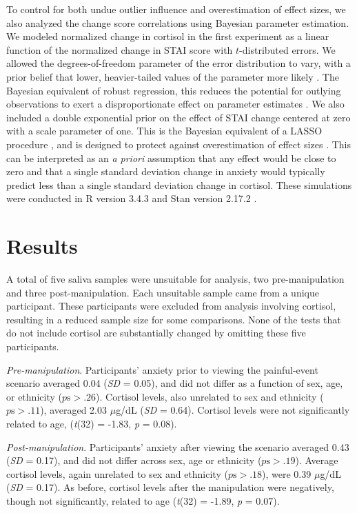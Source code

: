 \documentclass[review]{elsarticle}\usepackage[]{graphicx}\usepackage[]{color}
\begin{document}
To control for both undue outlier influence and overestimation of effect sizes, we also analyzed the change score correlations using Bayesian parameter estimation.
We modeled normalized change in cortisol in the first experiment as a linear function of the normalized change in STAI score with $t$-distributed errors.
We allowed the degrees-of-freedom parameter of the error distribution to vary, with a prior belief that lower, heavier-tailed values of the parameter more likely \cite{juarez2010model}.
The Bayesian equivalent of robust regression, this reduces the potential for outlying observations to exert a disproportionate effect on parameter estimates \cite{kruschke2010doing}.
We also included a double exponential prior on the effect of STAI change centered at zero with a scale parameter of one.
This is the Bayesian equivalent of a LASSO procedure \cite{tibshirani1996regression}, and is designed to protect against overestimation of effect sizes \cite{gelman2013bayesian}.
This can be interpreted as an \emph{a priori} assumption that any effect would be close to zero and that a single standard deviation change in anxiety would typically predict less than a single standard deviation change in cortisol.
These simulations were conducted in R version 3.4.3 \cite{rmanual2014} and Stan version 2.17.2 \cite{stan-software:2014}.

\section*{Results}
\label{sec:results1}

A total of five saliva samples were unsuitable for analysis, two pre-manipulation and three post-manipulation.
Each unsuitable sample came from a unique participant.
These participants were excluded from analysis involving cortisol, resulting in a reduced sample size for some comparisons.
None of the tests that do not include cortisol are substantially changed by omitting these five participants.

\emph{Pre-manipulation}. Participants' anxiety prior to viewing the painful-event scenario averaged 0.04 (\textit{SD} = 0.05), and did not differ as a function of sex, age, or ethnicity ($p \mbox{s} > .26$).
Cortisol levels, also unrelated to sex and ethnicity ($p \mbox{s} > .11$), averaged 2.03 $\mu$g/dL (\textit{SD} = 0.64).
Cortisol levels were not significantly related to age, (\textit{t}(32) = -1.83, \textit{p} =  0.08).

\emph{Post-manipulation}. Participants' anxiety after viewing the scenario averaged 0.43 (\textit{SD} = 0.17), and did not differ across sex, age or ethnicity ($p \mbox{s} > .19$).
Average cortisol levels, again unrelated to sex and ethnicity ($p \mbox{s} > .18$), were 0.39 $\mu$g/dL (\textit{SD} = 0.17).
As before, cortisol levels after the manipulation were negatively, though not significantly, related to age (\textit{t}(32) = -1.89, \textit{p} = 0.07).
\end{document}
